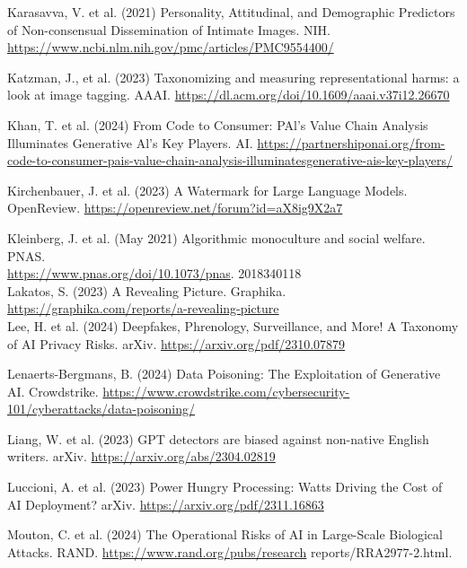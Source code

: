 \documentclass[10pt]{article}
\begin{document}
Karasavva, V. et al. (2021) Personality, Attitudinal, and Demographic Predictors of Non-consensual Dissemination of Intimate Images. NIH. \href{https://www.ncbi.nlm.nih.gov/pmc/articles/PMC9554400/}{https://www.ncbi.nlm.nih.gov/pmc/articles/PMC9554400/}

Katzman, J., et al. (2023) Taxonomizing and measuring representational harms: a look at image tagging. AAAI. \href{https://dl.acm.org/doi/10.1609/aaai.v37i12.26670}{https://dl.acm.org/doi/10.1609/aaai.v37i12.26670}

Khan, T. et al. (2024) From Code to Consumer: PAl's Value Chain Analysis Illuminates Generative Al's Key Players. AI. \href{https://partnershiponai.org/from-code-to-consumer-pais-value-chain-analysis-illuminatesgenerative-ais-key-players/}{https://partnershiponai.org/from-code-to-consumer-pais-value-chain-analysis-illuminatesgenerative-ais-key-players/}

Kirchenbauer, J. et al. (2023) A Watermark for Large Language Models. OpenReview. \href{https://openreview.net/forum?id=aX8ig9X2a7}{https://openreview.net/forum?id=aX8ig9X2a7}

Kleinberg, J. et al. (May 2021) Algorithmic monoculture and social welfare. PNAS.\\
\href{https://www.pnas.org/doi/10.1073/pnas}{https://www.pnas.org/doi/10.1073/pnas}. 2018340118\\
Lakatos, S. (2023) A Revealing Picture. Graphika. \href{https://graphika.com/reports/a-revealing-picture}{https://graphika.com/reports/a-revealing-picture}\\
Lee, H. et al. (2024) Deepfakes, Phrenology, Surveillance, and More! A Taxonomy of AI Privacy Risks. arXiv. \href{https://arxiv.org/pdf/2310.07879}{https://arxiv.org/pdf/2310.07879}

Lenaerts-Bergmans, B. (2024) Data Poisoning: The Exploitation of Generative AI. Crowdstrike. \href{https://www.crowdstrike.com/cybersecurity-101/cyberattacks/data-poisoning/}{https://www.crowdstrike.com/cybersecurity-101/cyberattacks/data-poisoning/}

Liang, W. et al. (2023) GPT detectors are biased against non-native English writers. arXiv. \href{https://arxiv.org/abs/2304.02819}{https://arxiv.org/abs/2304.02819}

Luccioni, A. et al. (2023) Power Hungry Processing: Watts Driving the Cost of AI Deployment? arXiv. \href{https://arxiv.org/pdf/2311.16863}{https://arxiv.org/pdf/2311.16863}

Mouton, C. et al. (2024) The Operational Risks of AI in Large-Scale Biological Attacks. RAND. \href{https://www.rand.org/pubs/research}{https://www.rand.org/pubs/research} reports/RRA2977-2.html.
\end{document}
